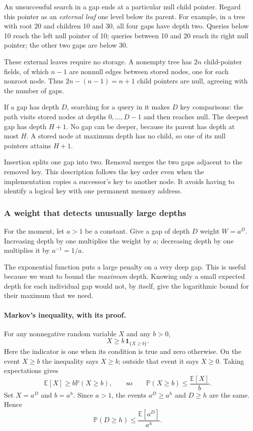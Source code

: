 \documentclass[11pt,a4paper]{article}
\theoremstyle{readable}
\newcommand{\E}{\mathbb E}
\newcommand{\Prob}{\mathbb P}
\newcommand{\ind}[1]{\mathbf 1_{\{#1\}}}
\begin{document}
An unsuccessful search in a gap ends at a particular null child pointer.
Regard this pointer as an \emph{external leaf} one level below its parent.
For example, in a tree with root 20 and children 10 and 30, all four
gaps have depth two. Queries below 10 reach the left null pointer of 10;
queries between 10 and 20 reach its right null pointer; the other two
gaps are below 30.

These external leaves require no storage. A nonempty tree has $2n$
child-pointer fields, of which $n-1$ are nonnull edges between stored
nodes, one for each nonroot node. Thus $2n-(n-1)=n+1$ child pointers
are null, agreeing with the
number of gaps.

If a gap has depth $D$, searching for a query in it makes $D$ key
comparisons: the path visits stored nodes at depths $0,\ldots,D-1$
and then reaches null. The deepest gap has depth $H+1$. No gap can be
deeper, because its parent has depth at most $H$. A stored node at
maximum depth has no child, so one of its null pointers attains $H+1$.

Insertion splits one gap into two. Removal merges the two gaps adjacent
to the removed key. This description follows the key order even when
the implementation copies a successor's key to another node. It avoids
having to identify a logical key with one permanent memory address.

\subsubsection*{A weight that detects unusually large depths}
For the moment, let $a>1$ be a constant. Give a gap of depth $D$ weight
$W=a^D$. Increasing depth by one multiplies the weight by $a$;
decreasing depth by one multiplies it by $a^{-1}=1/a$.

The exponential function puts a large penalty on a very deep gap.
This is useful because we want to bound the \emph{maximum} depth.
Knowing only a small expected depth for each individual gap would not,
by itself, give the logarithmic bound for their maximum that we need.

\paragraph{Markov's inequality, with its proof.}
For any nonnegative random variable $X$ and any $b>0$,
\[
  X\ge b\,\ind{X\ge b}.
\]
Here the indicator is one when its condition is true and zero otherwise.
On the event $X\ge b$ the inequality says $X\ge b$; outside that
event it says $X\ge0$. Taking expectations gives
\[
  \E[X]\ge b\Prob(X\ge b),
  \qquad\text{so}\qquad
  \Prob(X\ge b)\le\frac{\E[X]}b.
\]
Set $X=a^D$ and $b=a^h$. Since $a>1$, the events $a^D\ge a^h$
and $D\ge h$ are the same. Hence
\begin{equation}
  \Prob(D\ge h)\le\frac{\E[a^D]}{a^h}.
  \label{eq:markov}
\end{equation}
\end{document}

